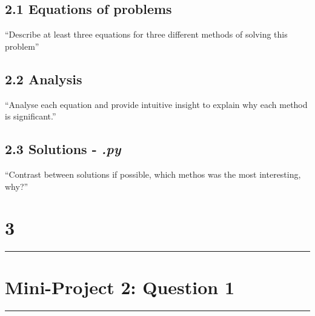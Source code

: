 \documentclass[hidelinks, 11pt]{article}
\begin{document}
\subsection*{2.1 Equations of problems}

\begin{center}
\end{center}

``Describe at least three equations for three different methods of solving this problem''

\subsection*{2.2 Analysis}

``Analyse each equation and provide intuitive insight to explain why each method is significant.''
\\

\subsection*{2.3 Solutions - \emph{.py}}

``Contrast between solutions if possible, which methos was the most interesting, why?''

\newpage

\begin{center}
  \section*{3}
  \noindent\rule{16cm}{0.4pt}
  \section*{Mini-Project 2: Question 1} %
  \noindent\rule{16cm}{0.4pt}
\end{center}
\end{document}

